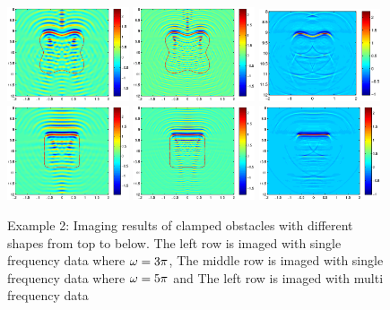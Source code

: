 \documentclass[11pt]{iopart}
\begin{document}
\begin{figure}
	\includegraphics[width=0.32\textwidth]{./graphic/p_leaf_3pi.eps}
	\includegraphics[width=0.32\textwidth]{./graphic/p_leaf_5pi.eps}
	\includegraphics[width=0.32\textwidth]{./graphic/p_leaf.eps}
	\includegraphics[width=0.32\textwidth]{./graphic/rectangle_3pi.eps}
	\includegraphics[width=0.32\textwidth]{./graphic/rectangle_5pi.eps}
	\includegraphics[width=0.32\textwidth]{./graphic/rectangle.eps}
	
	\caption{Example 2: Imaging results of clamped obstacles
		with different shapes from top to below. The left row is imaged with single frequency data where $\omega=3\pi$, The middle row is imaged with single frequency data where $\omega=5\pi$ and The left row is imaged with multi frequency data}\label{figure_2}
\end{figure}
\end{document}
